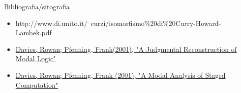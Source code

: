 \documentclass{beamer}
\begin{document}
\begin{frame}{Bibliografia/sitografia}

\begin{itemize}
  \item http://www.di.unito.it/~curzi/isomorfismo\%20di\%20Curry-Howard-Lambek.pdf 
  \item \href{https://www.cs.cmu.edu/~fp/papers/mscs00.pdf}{Davies, Rowan;
    Pfenning, Frank(2001), "A Judgmental Reconstruction of Modal Logic"}
  \item  \href{https://www.cs.cmu.edu/~fp/papers/jacm00.pdf}{Davies, Rowan; Pfenning, Frank (2001), "A Modal Analysis of Staged Computation"}
\end{itemize}
\end{frame}
\end{document}
